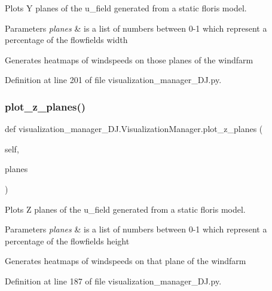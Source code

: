 Plots Y planes of the u\+\_\+field generated from a static floris model. 


\begin{DoxyParams}{Parameters}
{\em planes} & is a list of numbers between 0-\/1 which represent a percentage of the flowfield\textquotesingle{}s width\\
\hline
\end{DoxyParams}
Generates heatmaps of windspeeds on those planes of the windfarm 

Definition at line 201 of file visualization\+\_\+manager\+\_\+\+D\+J.\+py.

\mbox{\label{classvisualization__manager___d_j_1_1_visualization_manager_a05c519f1e0389278308ee046d27724cd}} 
\subsubsection{\texorpdfstring{plot\+\_\+z\+\_\+planes()}{plot\_z\_planes()}}
{\footnotesize\ttfamily def visualization\+\_\+manager\+\_\+\+D\+J.\+Visualization\+Manager.\+plot\+\_\+z\+\_\+planes (\begin{DoxyParamCaption}\item[{}]{self,  }\item[{}]{planes }\end{DoxyParamCaption})}



Plots Z planes of the u\+\_\+field generated from a static floris model. 


\begin{DoxyParams}{Parameters}
{\em planes} & is a list of numbers between 0-\/1 which represent a percentage of the flowfield\textquotesingle{}s height\\
\hline
\end{DoxyParams}
Generates heatmaps of windspeeds on that plane of the windfarm 

Definition at line 187 of file visualization\+\_\+manager\+\_\+\+D\+J.\+py.

\mbox{\label{classvisualization__manager___d_j_1_1_visualization_manager_a32793e43e3e04b3819dea7740e5b9ca1}} 
